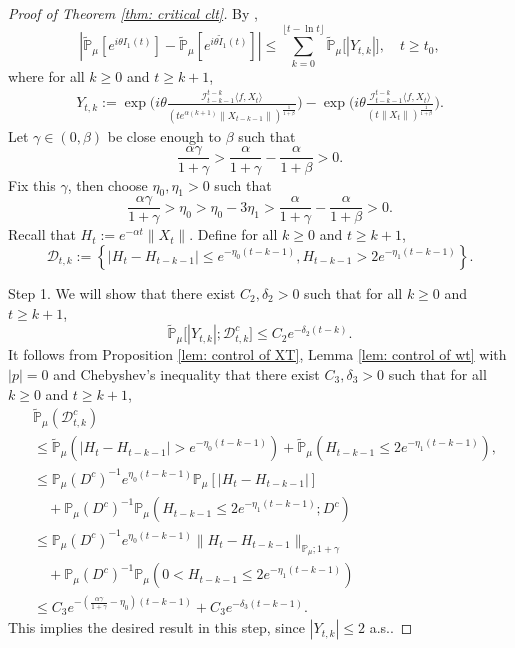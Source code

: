 \documentclass[12pt,a4paper]{amsart}
\theoremstyle{plain}
\theoremstyle{definition}
\numberwithin{equation}{section}
\begin{document}
\begin{proof}[Proof of Theorem \ref{thm: critical clt}]
    By \cite[Lemma 3.4.3]{Durrett2010Probability},
\begin{equation}\label{ineq: control of I1t}
    |\mathbb{\widetilde{P}}_{\mu}[e^{i\theta I_1(t)}] - \mathbb{\widetilde{P}}_{\mu} [e^{i\theta\widetilde{I}_1(t)}]|
    \leq \sum_{k=0}^{\lfloor t-\ln t \rfloor}\mathbb{\widetilde{P}}_{\mu}\big[|Y_{t,k}|\big],
    \quad t\geq t_0,
\end{equation}
    where for all $k \geq 0$ and $t\geq k+1$,
\begin{align}
    Y_{t,k}
    :=\exp\Big(i\theta\frac{\mathcal I_{t-k-1}^{t-k}\langle f ,X_t\rangle}{(t e^{\alpha(k+1)}\|X_{t-k-1}\|)^{\frac{1}{1+\beta}}}\Big)-\exp\Big(i\theta\frac{\mathcal I_{t-k-1}^{t-k}\langle f ,X_t\rangle}{(t\|X_t\|)^{\frac{1}{1+\beta}}}\Big).
\end{align}
    Let $\gamma \in (0,\beta)$ be close enough to $\beta$ such that
\[
    \frac{\alpha \gamma}{1+\gamma} > \frac{\alpha}{1+\gamma} - \frac{\alpha}{1+\beta} > 0.
\]
    Fix this $\gamma$, then choose $\eta_0,\eta_1>0$ such that
\[
    \frac{\alpha \gamma}{1+\gamma} >\eta_0 > \eta_0 - 3\eta_1 > \frac{\alpha}{1+\gamma} - \frac{\alpha}{1+\beta} > 0.
\]
    Recall that $H_t := e^{-\alpha t}\|X_t\|$.
    Define for all $k \geq 0$ and $t\geq k+1$,
\begin{equation}
\label{def: Dtk}
    \mathcal{D}_{t,k}:=\left\{|H_t-H_{t-k-1}|\leq  e^{-\eta_0 (t-k-1)}, H_{t-k-1}> 2e^{-\eta_1(t-k-1)}\right\}.
\end{equation}

    Step 1. We will show that there exist $C_2,\delta_2 >0$ such that for all $k \geq 0$ and $t\geq k+1$,
\begin{equation}
\label{thm121}
    \mathbb{\widetilde{P}}_{\mu}\big[|Y_{t,k}|;\mathcal{D}^c_{t,k}\big]
    \leq C_2 e^{-\delta_2 (t-k)}.
\end{equation}
    It follows from Proposition \ref{lem: control of XT}, Lemma \ref{lem: control of wt} with $|p|=0$ and Chebyshev's inequality that there exist $C_3, \delta_3>0$ such that for all $k \geq 0$ and $t\geq k+1$,
\begin{align}
\label{eq: prob of Dtkc}
    &\mathbb{\widetilde{P}}_{\mu}(\mathcal{D}_{t,k}^c)
    \\&\leq \mathbb{\widetilde{P}}_{\mu}(|H_t-H_{t-k-1}| > e^{-\eta_0 (t-k-1)})+\mathbb{\widetilde{P}}_{\mu}(H_{t-k-1}\leq 2e^{-\eta_1(t-k-1)}),
    \\&\leq \mathbb{P}_{\mu}(D^c)^{-1}e^{\eta_0(t-k-1)}\mathbb{P}_{\mu}[|H_t-H_{t-k-1}|]
    \\&\quad +\mathbb{P}_{\mu}(D^c)^{-1} \mathbb P_\mu(H_{t-k-1}\leq 2e^{-\eta_1(t-k-1)}; D^c)
    \\&\leq \mathbb{P}_{\mu}(D^c)^{-1}  e^{\eta_0(t-k-1)}\|H_t - H_{t-k-1}\|_{\mathbb P_\mu; 1+\gamma}
    \\&\quad + \mathbb{P}_{\mu}(D^c)^{-1} \mathbb P_\mu(0<H_{t-k-1}\leq 2e^{-\eta_1(t-k-1)})
    \\&\leq C_3 e^{-(\frac{\alpha \gamma}{1+\gamma} - \eta_0)(t-k-1)}+C_3 e^{-\delta_3(t-k-1)}.
\end{align}
    This implies the desired result in this step, since $|Y_{t,k}| \leq 2$ a.s..


\end{proof}
\end{document}
